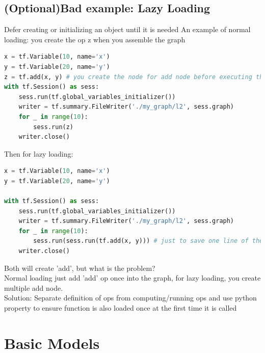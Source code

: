 \documentclass{article}
\begin{document}
	\subsection{(Optional)Bad example: Lazy Loading}
	Defer creating or initializing an object until it is needed
	An example of normal loading: you create the op z when you assemble the graph
\begin{lstlisting}[language=Python,morekeywords ={as}]
x = tf.Variable(10, name='x')
y = tf.Variable(20, name='y')
z = tf.add(x, y) # you create the node for add node before executing the graph
with tf.Session() as sess:
	sess.run(tf.global_variables_initializer())
	writer = tf.summary.FileWriter('./my_graph/l2', sess.graph)
	for _ in range(10):
		sess.run(z)
	writer.close()	
\end{lstlisting}	
	Then for lazy loading:
\begin{lstlisting}[language=Python,morekeywords ={as}]
x = tf.Variable(10, name='x')
y = tf.Variable(20, name='y')

with tf.Session() as sess:
	sess.run(tf.global_variables_initializer())
	writer = tf.summary.FileWriter('./my_graph/l2', sess.graph)
	for _ in range(10):
		sess.run(sess.run(tf.add(x, y))) # just to save one line of the code
	writer.close()	
\end{lstlisting}
Both will create 'add', but what is the problem?\\
Normal loading just add 'add' op once into the graph, for lazy loading, you create multiple add node.\\
Solution: Separate definition of ops from computing/running ops and use python property to ensure function is also loaded once at the first time it is called
	\section{Basic Models}
\end{document}
